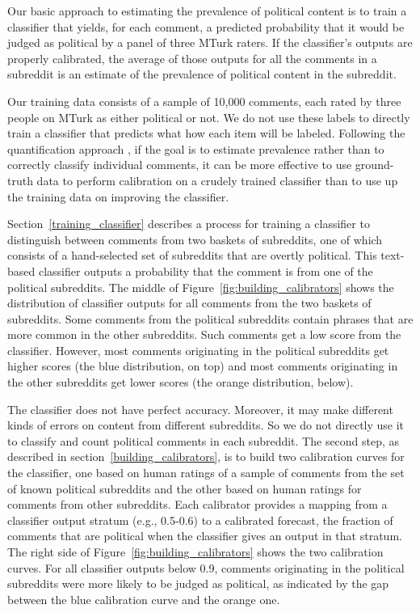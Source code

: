 \documentclass[letterpaper]{article} %
\begin{document}
Our basic approach to estimating the prevalence of political content is to train a classifier that yields, for each comment, a predicted probability that it would be judged as political by a panel of three MTurk raters. If the classifier's outputs are properly calibrated, the average of those outputs for all the comments in a subreddit is an estimate of the prevalence of political content in the subreddit.

Our training data consists of a sample of 10,000 comments, each rated by three people on MTurk as either political or not.
We do not use these labels to directly train a classifier that predicts what how each item will be labeled. Following the quantification approach \cite{forman2006quantifying,gonzalez2017review}, if the goal is to estimate prevalence rather than to correctly classify individual comments, it can be more effective to use ground-truth data to perform calibration on a crudely trained classifier than to use up the training data on improving the classifier.

Section~\ref{training_classifier} describes a process for training a classifier to distinguish between comments from two baskets of subreddits, one of which consists of a hand-selected set of subreddits that are overtly political. This text-based classifier outputs a probability that the comment is from one of the political subreddits. The middle of Figure~\ref{fig:building_calibrators} shows the distribution of classifier outputs for all comments from the two baskets of subreddits. Some comments from the political subreddits contain phrases that are more common in the other subreddits. Such comments get a low score from the classifier. However, most comments originating in the political subreddits get higher scores (the blue distribution, on top) and most comments originating in the other subreddits get lower scores (the orange distribution, below).

The classifier does not have perfect accuracy. Moreover, it may make different kinds of errors on content from different subreddits. So we do not directly use it to classify and count political comments in each subreddit. The second step, as described in section~\ref{building_calibrators}, is to build two calibration curves for the classifier, one based on human ratings of a sample of comments from the set of known political subreddits and the other based on human ratings for comments from other subreddits. Each calibrator provides a mapping from a classifier output stratum (e.g., 0.5-0.6) to a calibrated forecast, the fraction of comments that are political when the classifier gives an output in that stratum. The right side of Figure~\ref{fig:building_calibrators} shows the two calibration curves. For all classifier outputs below 0.9, comments originating in the political subreddits were more likely to be judged as political, as indicated by the gap between the blue calibration curve and the orange one.
\end{document}
